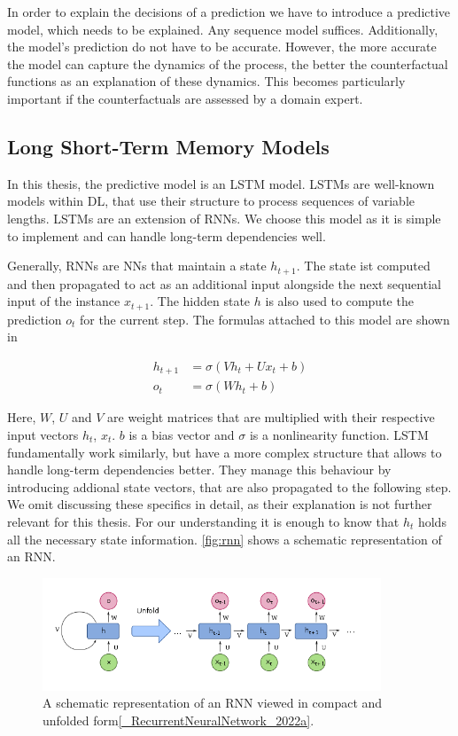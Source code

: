 \documentclass[./../../paper.tex]{subfiles}
\begin{document}
In order to explain the decisions of a prediction we have to introduce a predictive model, which needs to be explained. Any sequence model suffices. Additionally, the model's prediction do not have to be accurate. However, the more accurate the model can capture the dynamics of the process, the better the counterfactual functions as an explanation of these dynamics. This becomes particularly important if the counterfactuals are assessed by a domain expert. 

\subsection{Long Short-Term Memory Models}
In this thesis, the predictive model is an \gls{LSTM} model. LSTMs are well-known models within \gls{DL}, that use their structure to process sequences of variable lengths\autocite{hochreiter}. LSTMs are an extension of \glspl{RNN}. We choose this model as it is simple to implement and can handle long-term dependencies well.

Generally, \glspl{RNN} are \glspl{NN} that maintain a state $h_{t+1}$. The state ist computed and then propagated to act as an additional input alongside the next sequential input of the instance $x_{t+1}$. The hidden state $h$ is also used to compute the prediction $o_{t}$ for the current step. The formulas attached to this model are shown in 

\begin{align}
    \label{eq:rnn}
    h_{t+1} &= \sigma(V h_t + U x_t + b)\\
    o_{t} &= \sigma(W h_t + b)
\end{align}

Here, $W$, $U$ and $V$ are weight matrices that are multiplied with their respective input vectors $h_t$, $x_t$. $b$ is a bias vector and $\sigma$ is a nonlinearity function. LSTM fundamentally work similarly, but have a more complex structure that allows to handle long-term dependencies better. They manage this behaviour by introducing addional state vectors, that are also propagated to the following step. We omit discussing these specifics in detail, as their explanation is not further relevant for this thesis. For our understanding it is enough to know that $h_t$ holds all the necessary state information. \autoref{fig:rnn} shows a schematic representation of an RNN.   

\begin{figure}[htb]
    \label{fig:rnn}
    \centering
    \includegraphics[width=0.9\textwidth]{figures/rnn.png}
    \caption{A schematic representation of an RNN viewed in compact and unfolded form\autoref{_RecurrentNeuralNetwork_2022a}.}
\end{figure}
\end{document}
